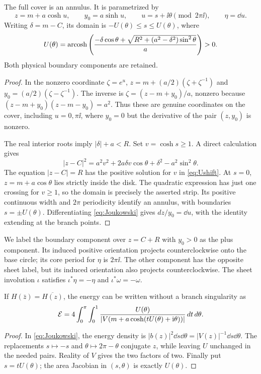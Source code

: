 \begin{lemma}\label{lem:cylinder}
The full cover is an annulus. It is parametrized by
\begin{equation}\label{eq:Joukowski}
 z=m+a\cosh u,\qquad y_0=a\sinh u,\qquad
 u=s+\ii\theta\pmod{2\pi\ii},\qquad \eta=\dd u.
\end{equation}
Writing $\delta=m-C$, its domain is $-U(\theta)\le s\le U(\theta)$,
where
\begin{equation}\label{eq:Ushift}
 U(\theta)=\operatorname{arcosh}\left(
 \frac{-\delta\cos\theta+
 \sqrt{R^2+(a^2-\delta^2)\sin^2\theta}}a\right)>0.
\end{equation}
Both physical boundary components are retained.
\end{lemma}
\begin{proof}
In the nonzero coordinate $\zeta=e^u$,
$z=m+(a/2)(\zeta+\zeta^{-1})$ and
$y_0=(a/2)(\zeta-\zeta^{-1})$. The inverse is
$\zeta=(z-m+y_0)/a$, nonzero because
$(z-m+y_0)(z-m-y_0)=a^2$. Thus these are genuine coordinates on
the cover, including $u=0,\pi\ii$, where $y_0=0$ but the derivative
of the pair $(z,y_0)$ is nonzero.

The real interior roots imply $|\delta|+a<R$. Set $v=\cosh s\ge1$.
A direct calculation gives
\[
 |z-C|^2=a^2v^2+2a\delta v\cos\theta+
                \delta^2-a^2\sin^2\theta.
\]
The equation $|z-C|=R$ has the positive solution for $v$ in
\eqref{eq:Ushift}. At $s=0$, $z=m+a\cos\theta$ lies strictly inside
the disk. The quadratic expression has just one crossing for $v\ge1$,
so the domain is precisely the asserted strip. Its positive continuous
width and $2\pi$ periodicity identify an annulus, with boundaries
$s=\pm U(\theta)$. Differentiating \eqref{eq:Joukowski} gives
$dz/y_0=\dd u$, with the identity extending at the branch points.
\end{proof}

We label the boundary component over $z=C+R$ with $y_0>0$ as the plus
component. Its induced positive orientation projects counterclockwise
onto the base circle; its core period for $\eta$ is $2\pi\ii$.
The other component has the opposite sheet label, but its induced
orientation also projects counterclockwise. The sheet involution
$\iota$ satisfies $\iota^*\eta=-\eta$ and $\iota^*\omega=-\omega$.

\begin{corollary}\label{cor:direct}
If $H(\bar z)=\overline{H(z)}$, the energy can be written without a
branch singularity as
\begin{equation}\label{eq:directU}
 \mathcal E=4\int_0^\pi\int_0^1
 \frac{U(\theta)}{|V(m+a\cosh(tU(\theta)+\mathrm i\theta))|}
          \,d t\,d\theta.
\end{equation}
\end{corollary}
\begin{proof}
In \eqref{eq:Joukowski}, the energy density is
$|b(z)|^2\dd s\dd\theta=|V(z)|^{-1}\dd s\dd\theta$.
The replacements $s\mapsto-s$ and $\theta\mapsto2\pi-\theta$
conjugate $z$, while leaving $U$ unchanged in the needed pairs.
Reality of $V$ gives the two factors of two. Finally put $s=tU(\theta)$;
the area Jacobian in $(s,\theta)$ is exactly $U(\theta)$.
\end{proof}
